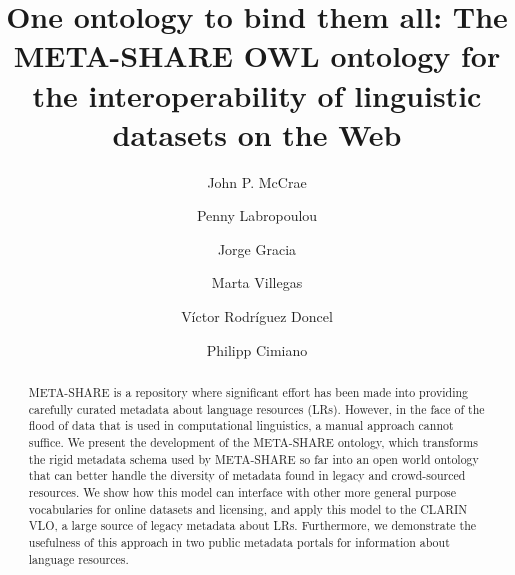 \documentclass{llncs}
\begin{document}
\title{One ontology to bind them all: The META-SHARE OWL ontology for the interoperability of linguistic datasets on the Web}
%
%
\author{John P. McCrae \and Penny Labropoulou \and Jorge
Gracia \and Marta Villegas \and V\'ictor Rodr\'iguez
Doncel \and Philipp Cimiano}
%
%
%
\maketitle %
\begin{abstract}
    META-SHARE is a repository where significant effort has been made into
    providing carefully curated metadata about language resources (LRs).
    However, in the face of the flood of data that is used in computational
    linguistics, a manual approach cannot suffice. We present the development of
    the META-SHARE ontology, which transforms the rigid metadata schema used by META-SHARE so far into an open world ontology that can better handle the diversity of
    metadata found in legacy and crowd-sourced resources. We show how this model can interface with other more general
    purpose vocabularies for online datasets and licensing, and apply this model
    to the CLARIN VLO, a large source of legacy metadata about LRs. Furthermore,
    we demonstrate the usefulness of this approach in two public metadata
    portals for information about language resources.
\end{abstract}
\end{document}
